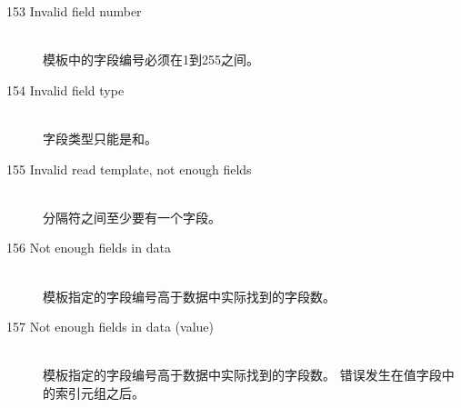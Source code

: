 \begin{description}
\item[153 Invalid field number ]\ \\
  模板中的字段编号必须在1到255之间。
\item[154 Invalid field type ]\ \\
  字段类型只能是和。
\item[155 Invalid read template, not enough fields]\ \\
  分隔符之间至少要有一个字段。
\item[156 Not enough fields in data]\ \\
  模板指定的字段编号高于数据中实际找到的字段数。
\item[157 Not enough fields in data (value)]\ \\
  模板指定的字段编号高于数据中实际找到的字段数。
  错误发生在值字段中的索引元组之后。


\end{description}
